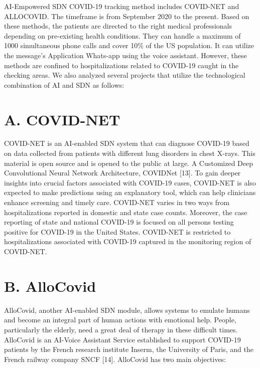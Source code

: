\documentclass[10pt]{article}
\begin{document}
AI-Empowered SDN COVID-19 tracking method includes COVID-NET and ALLOCOVID. The timeframe is from September 2020 to the present. Based on these methods, the patients are directed to the right medical professionals depending on pre-existing health conditions. They can handle a maximum of 1000 simultaneous phone calls and cover 10\% of the US population. It can utilize the message's Application Whats-app using the voice assistant. However, these methods are confined to hospitalizations related to COVID-19 caught in the checking areas. We also analyzed several projects that utilize the technological combination of $\mathrm{AI}$ and SDN as follows:

\section{A. COVID-NET}
COVID-NET is an AI-enabled SDN system that can diagnose COVID-19 based on data collected from patients with different lung disorders in chest X-rays. This material is open source and is opened to the public at large. A Customized Deep Convolutional Neural Network Architecture, COVIDNet [13]. To gain deeper insights into crucial factors associated with COVID-19 cases, COVID-NET is also expected to make predictions using an explanatory tool, which can help clinicians enhance screening and timely care. COVID-NET varies in two ways from hospitalizations reported in domestic and state case counts. Moreover, the case reporting of state and national COVID-19 is focused on all persons testing positive for COVID-19 in the United States. COVID-NET is restricted to hospitalizations associated with COVID-19 captured in the monitoring region of COVID-NET.

\section{B. AlloCovid}
AlloCovid, another AI-enabled SDN module, allows systems to emulate humans and become an integral part of human actions with emotional help. People, particularly the elderly, need a great deal of therapy in these difficult times. AlloCovid is an AI-Voice Assistant Service established to support COVID-19 patients by the French research institute Inserm, the University of Paris, and the French railway company SNCF [14]. AlloCovid has two main objectives:
\end{document}
